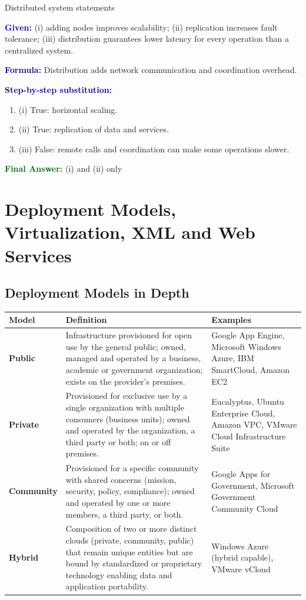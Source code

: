 \documentclass[11pt,a4paper,openany]{report}
\newcommand{\Given}{\par\textbf{\textcolor{navy}{Given:}} }
\newcommand{\Formula}{\par\textbf{\textcolor{navy}{Formula:}} }
\newcommand{\Steps}{\par\textbf{\textcolor{navy}{Step-by-step substitution:}}\par}
\newcommand{\Answer}{\par\textbf{\textcolor{darkgreen}{Final Answer:}} }
\begin{document}
\begin{solved}{Distributed system statements}
\Given (i) adding nodes improves scalability; (ii) replication increases fault tolerance;
(iii) distribution guarantees lower latency for every operation than a centralized system.
\Formula Distribution adds network communication and coordination overhead.
\Steps
\begin{enumerate}[leftmargin=*]
  \item (i) True: horizontal scaling.
  \item (ii) True: replication of data and services.
  \item (iii) False: remote calls and coordination can make some operations slower.
\end{enumerate}
\Answer (i) and (ii) only
\end{solved}

\chapter{Deployment Models, Virtualization, XML and Web Services}

\section{Deployment Models in Depth}
\begin{center}
\begin{tabularx}{\textwidth}{>{\bfseries}lXX}
\toprule
Model & Definition & Examples\\
\midrule
Public & Infrastructure provisioned for open use by the general public; owned, managed and operated by a
business, academic or government organization; exists on the provider's premises. & Google App Engine,
Microsoft Windows Azure, IBM SmartCloud, Amazon EC2\\
Private & Provisioned for exclusive use by a single organization with multiple consumers (business
units); owned and operated by the organization, a third party or both; on or off premises. & Eucalyptus,
Ubuntu Enterprise Cloud, Amazon VPC, VMware Cloud Infrastructure Suite\\
Community & Provisioned for a specific community with shared concerns (mission, security, policy,
compliance); owned and operated by one or more members, a third party, or both. & Google Apps for
Government, Microsoft Government Community Cloud\\
Hybrid & Composition of two or more distinct clouds (private, community, public) that remain unique
entities but are bound by standardized or proprietary technology enabling data and application
portability. & Windows Azure (hybrid capable), VMware vCloud\\
\bottomrule
\end{tabularx}
\end{center}
\end{document}
